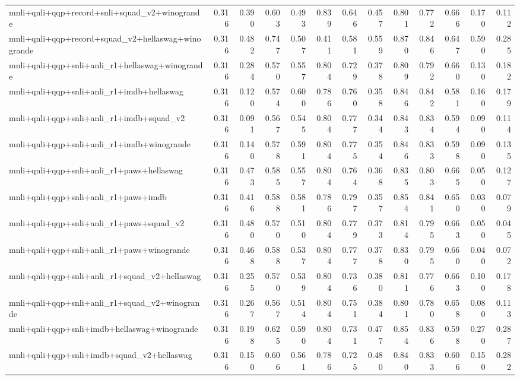 \begin{table}[t]
\begin{tabular}{lrrrrrrrrrrrr}
    mnli+qnli+qqp+record+snli+squad\_v2+winogrande & 0.316 & 0.390 & 0.603 & 0.493 & 0.839 & 0.646 & 0.457 & 0.801 & 0.772 & 0.666 & 0.170 & 0.112 \\
    mnli+qnli+qqp+record+squad\_v2+hellaswag+winogrande & 0.316 & 0.482 & 0.747 & 0.507 & 0.411 & 0.581 & 0.559 & 0.870 & 0.846 & 0.647 & 0.590 & 0.285 \\
    mnli+qnli+qqp+snli+anli\_r1+hellaswag+winogrande & 0.316 & 0.284 & 0.570 & 0.557 & 0.804 & 0.729 & 0.378 & 0.809 & 0.792 & 0.660 & 0.130 & 0.182 \\
    mnli+qnli+qqp+snli+anli\_r1+imdb+hellaswag & 0.316 & 0.120 & 0.574 & 0.600 & 0.786 & 0.760 & 0.358 & 0.846 & 0.842 & 0.581 & 0.160 & 0.179 \\
    mnli+qnli+qqp+snli+anli\_r1+imdb+squad\_v2 & 0.316 & 0.091 & 0.567 & 0.545 & 0.804 & 0.777 & 0.344 & 0.843 & 0.834 & 0.594 & 0.090 & 0.114 \\
    mnli+qnli+qqp+snli+anli\_r1+imdb+winogrande & 0.316 & 0.140 & 0.578 & 0.591 & 0.804 & 0.775 & 0.354 & 0.846 & 0.833 & 0.598 & 0.090 & 0.135 \\
    mnli+qnli+qqp+snli+anli\_r1+paws+hellaswag & 0.316 & 0.473 & 0.585 & 0.557 & 0.804 & 0.764 & 0.368 & 0.835 & 0.803 & 0.665 & 0.050 & 0.127 \\
    mnli+qnli+qqp+snli+anli\_r1+paws+imdb & 0.316 & 0.416 & 0.588 & 0.581 & 0.786 & 0.797 & 0.357 & 0.854 & 0.841 & 0.650 & 0.030 & 0.079 \\
    mnli+qnli+qqp+snli+anli\_r1+paws+squad\_v2 & 0.316 & 0.480 & 0.570 & 0.510 & 0.804 & 0.779 & 0.373 & 0.814 & 0.795 & 0.663 & 0.050 & 0.045 \\
    mnli+qnli+qqp+snli+anli\_r1+paws+winogrande & 0.316 & 0.468 & 0.588 & 0.537 & 0.804 & 0.777 & 0.378 & 0.830 & 0.795 & 0.660 & 0.040 & 0.072 \\
    mnli+qnli+qqp+snli+anli\_r1+squad\_v2+hellaswag & 0.316 & 0.255 & 0.570 & 0.539 & 0.804 & 0.736 & 0.380 & 0.811 & 0.776 & 0.663 & 0.100 & 0.178 \\
    mnli+qnli+qqp+snli+anli\_r1+squad\_v2+winogrande & 0.316 & 0.267 & 0.567 & 0.514 & 0.804 & 0.751 & 0.384 & 0.801 & 0.780 & 0.658 & 0.080 & 0.113 \\
    mnli+qnli+qqp+snli+imdb+hellaswag+winogrande & 0.316 & 0.198 & 0.625 & 0.590 & 0.804 & 0.731 & 0.477 & 0.854 & 0.836 & 0.598 & 0.270 & 0.287 \\
    mnli+qnli+qqp+snli+imdb+squad\_v2+hellaswag & 0.316 & 0.150 & 0.606 & 0.561 & 0.786 & 0.725 & 0.480 & 0.840 & 0.833 & 0.606 & 0.150 & 0.282 \\

\end{tabular}
\end{table}
